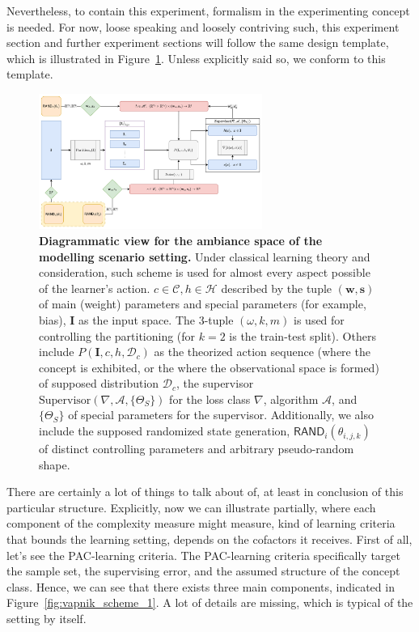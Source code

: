\documentclass[10pt]{article}
\begin{document}
Nevertheless, to contain this experiment, formalism in the experimenting concept is needed. For now, loose speaking and loosely contriving such, this experiment section and further experiment sections will follow the same design template, which is illustrated in Figure~\ref{fig:vapnik_scheme}. Unless explicitly said so, we conform to this template. 
\begin{figure}[htb]
  \centering
  \includegraphics[width=0.65\textwidth]{media/Diagramatic_Modelling_View.png}
  \caption{\textbf{Diagrammatic view for the ambiance space of the modelling scenario setting.} Under classical learning theory and consideration, such scheme is used for almost every aspect possible of the learner's action. $c\in\mathcal{C}, h\in \mathcal{H}$ described by the tuple $(\mathbf{w},\mathbf{s})$ of main (weight) parameters and special parameters (for example, bias), $\mathbf{I}$ as the input space. The 3-tuple $(\omega, k,m)$ is used for controlling the partitioning (for $k=2$ is the train-test split). Others include $P(\mathbf{I},c,h,\mathcal{D}_{c})$ as the theorized action sequence (where the concept is exhibited, or the where the observational space is formed) of supposed distribution $\mathcal{D}_{c}$, the supervisor $\text{Supervisor}(\nabla, \mathcal{A}, \{\Theta_{S}\})$ for the loss class $\nabla$, algorithm $\mathcal{A}$, and $\{\Theta_{S}\}$ of special parameters for the supervisor. Additionally, we also include the supposed randomized state generation, $\mathsf{RAND}_{i}(\theta_{i,j,k})$ of distinct controlling parameters and arbitrary pseudo-random shape.}
  \label{fig:vapnik_scheme}
\end{figure}

There are certainly a lot of things to talk about of, at least in conclusion of this particular structure. Explicitly, now we can illustrate partially, where each component of the complexity measure might measure, kind of learning criteria that bounds the learning setting, depends on the cofactors it receives. First of all, let's see the PAC-learning criteria. The PAC-learning criteria specifically target the sample set, the supervising error, and the assumed structure of the concept class. Hence, we can see that there exists three main components, indicated in Figure~\ref{fig:vapnik_scheme_1}. A lot of details are missing, which is typical of the setting by itself. 
\end{document}
